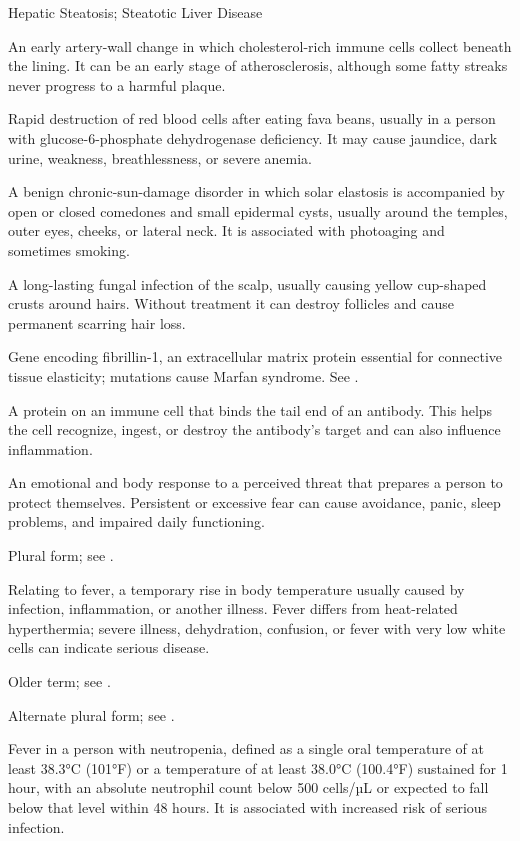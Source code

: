 \synonyms
Hepatic Steatosis; Steatotic Liver Disease

 An early artery-wall change in which cholesterol-rich immune cells collect beneath the lining. It can be an early stage of atherosclerosis, although some fatty streaks never progress to a harmful plaque.

 Rapid destruction of red blood cells after eating fava beans, usually in a person with glucose-6-phosphate dehydrogenase deficiency. It may cause jaundice, dark urine, weakness, breathlessness, or severe anemia.

 A benign chronic-sun-damage disorder in which solar elastosis is accompanied by open or closed comedones and small epidermal cysts, usually around the temples, outer eyes, cheeks, or lateral neck. It is associated with photoaging and sometimes smoking.

 A long-lasting fungal infection of the scalp, usually causing yellow cup-shaped crusts around hairs. Without treatment it can destroy follicles and cause permanent scarring hair loss.

 Gene encoding fibrillin-1, an extracellular matrix protein essential for connective tissue elasticity; mutations cause Marfan syndrome. See .

 A protein on an immune cell that binds the tail end of an antibody. This helps the cell recognize, ingest, or destroy the antibody’s target and can also influence inflammation.

 An emotional and body response to a perceived threat that prepares a person to protect themselves. Persistent or excessive fear can cause avoidance, panic, sleep problems, and impaired daily functioning.

 Plural form; see .

 Relating to fever, a temporary rise in body temperature usually caused by infection, inflammation, or another illness. Fever differs from heat-related hyperthermia; severe illness, dehydration, confusion, or fever with very low white cells can indicate serious disease.

 Older term; see .

 Alternate plural form; see .

 Fever in a person with neutropenia, defined as a single oral temperature of at least 38.3°C (101°F) or a temperature of at least 38.0°C (100.4°F) sustained for 1 hour, with an absolute neutrophil count below 500 cells/µL or expected to fall below that level within 48 hours. It is associated with increased risk of serious infection.

